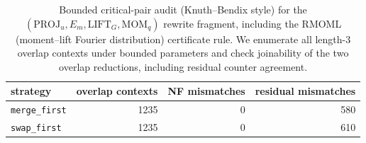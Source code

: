 \begin{table}[H]
\centering
\scriptsize
\setlength{\tabcolsep}{6pt}
\caption{Bounded critical-pair audit (Knuth--Bendix style) for the $(\mathrm{PROJ}_u,E_m,\mathrm{LIFT}_G,\mathrm{MOM}_q)$ rewrite fragment, including the RMOML (moment--lift Fourier distribution) certificate rule. We enumerate all length-3 overlap contexts under bounded parameters and check joinability of the two overlap reductions, including residual counter agreement.}
\label{tab:pom_projword_four_gen_kb_completion_audit}
\begin{tabular}{l r r r}
\toprule
strategy & overlap contexts & NF mismatches & residual mismatches\\
\midrule
\texttt{merge\_first} & 1235 & 0 & 580\\
\texttt{swap\_first} & 1235 & 0 & 610\\
\bottomrule
\end{tabular}
\end{table}
